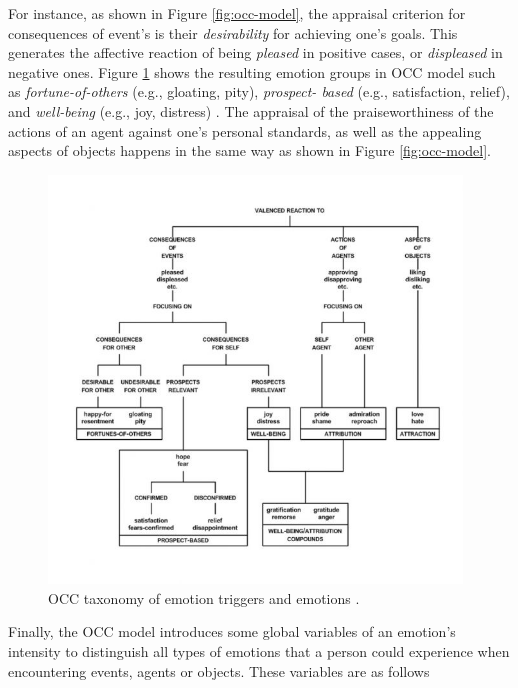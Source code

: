 \documentclass[12pt]{report}
\begin{document}
For instance, as shown in Figure \ref{fig:occ-model}, the appraisal criterion
for consequences of event’s is their \textit{desirability} for achieving one's
goals. This generates the affective reaction of being \textit{pleased} in
positive cases, or \textit{displeased} in negative ones. Figure
\ref{fig:occ-structure} shows the resulting emotion groups in OCC model such as
\textit{fortune-of-others} (e.g., gloating, pity), \textit{prospect- based}
(e.g., satisfaction, relief), and \textit{well-being} (e.g., joy, distress)
\cite{occ:structure}. The appraisal of the praiseworthiness of the actions of an
agent against one's personal standards, as well as the appealing aspects of
objects happens in the same way as shown in Figure \ref{fig:occ-model}.

\begin{figure}[tbh]
  \center
  \includegraphics[width=0.978\textwidth]{figure/occ-structure.jpg}
  \caption{OCC taxonomy of emotion triggers and emotions \cite{occ:structure}.}
  \label{fig:occ-structure}
\end{figure}

Finally, the OCC model introduces some global variables of an emotion's
intensity to distinguish all types of emotions that a person could experience when
encountering events, agents or objects. These variables are as follows
\end{document}
